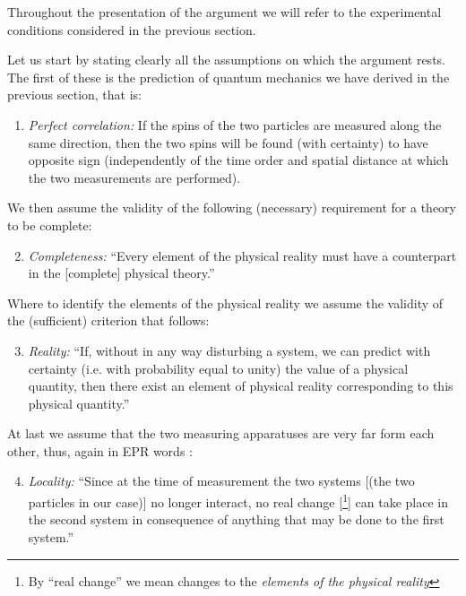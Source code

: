 \begin{note}
Throughout the presentation of the argument we will refer to the experimental conditions considered in the previous section.
\end{note}

Let us start by stating clearly all the assumptions on which the argument rests. The first of these is the prediction of quantum mechanics we have derived in the previous section, that is:
\begin{enumerate}
  \renewcommand{\theenumi}{\alph{enumi}}
  \renewcommand{\labelenumi}{(\theenumi)}
\item \label{itm:epr-perfect-correlation} \textit{Perfect correlation:} If the spins of the two particles are measured along the same direction, then the two spins will be found (with certainty) to have opposite sign (independently of the time order and spatial distance at which the two measurements are performed).
\end{enumerate}
We then assume the validity of the following (necessary) requirement for a theory to be complete:
\begin{enumerate}
  \setcounter{enumi}{1}
  \renewcommand{\theenumi}{\alph{enumi}}
  \renewcommand{\labelenumi}{(\theenumi)}
\item \label{itm:epr-completeness} \textit{Completeness:} ``Every element of the physical reality must have a counterpart in the [complete] physical theory.'' \cite{PhysRev.47.777}
\end{enumerate}
Where to identify the elements of the physical reality we assume the validity of the (sufficient) criterion that follows:
\begin{enumerate}
  \setcounter{enumi}{2}
  \renewcommand{\theenumi}{\alph{enumi}}
  \renewcommand{\labelenumi}{(\theenumi)}
\item \label{itm:epr-reality} \textit{Reality:} ``If, without in any way disturbing a system, we can predict with certainty (i.e. with probability equal to unity) the value of a physical quantity, then there exist an element of physical reality corresponding to this physical quantity.'' \cite{PhysRev.47.777}
\end{enumerate}
At last we assume that the two measuring apparatuses are very far form each other, thus, again in EPR words \cite{PhysRev.47.777}:
\begin{enumerate}
  \setcounter{enumi}{3}
  \renewcommand{\theenumi}{\alph{enumi}}
  \renewcommand{\labelenumi}{(\theenumi)}
\item \label{itm:epr-locality} \textit{Locality:} ``Since at the time of measurement the two systems [(the two particles in our case)] no longer interact, no real change [\footnote{By ``real change'' we mean changes to the \textit{elements of the physical reality}}] can take place in the second system in consequence of anything that may be done to the first system.''
\end{enumerate}

